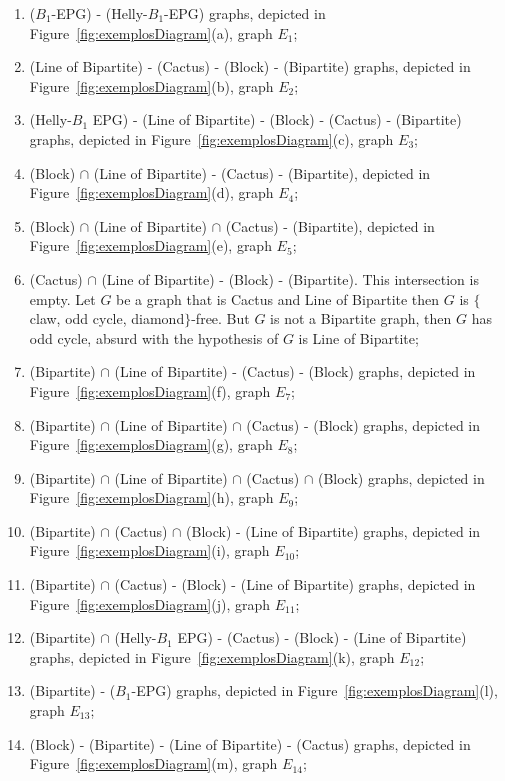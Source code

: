\documentclass[9pt]{entcs}
\begin{document}
\begin{enumerate}[label=(\arabic*)]
    \item ($B_1$-EPG)  - (Helly-$B_1$-EPG) graphs, depicted in Figure~\ref{fig:exemplosDiagram}(a), graph $E_1$;%
    
    \item (Line of Bipartite)  - (Cactus) - (Block) - (Bipartite) graphs, depicted in Figure~\ref{fig:exemplosDiagram}(b), graph $E_2$;%
    \item (Helly-$B_1$ EPG) - (Line of Bipartite) - (Block) - (Cactus) - (Bipartite) graphs, depicted in Figure~\ref{fig:exemplosDiagram}(c), graph $E_3$;%
    \item (Block) $\cap$ (Line of Bipartite) - (Cactus) - (Bipartite), depicted in Figure~\ref{fig:exemplosDiagram}(d), graph $E_4$;%
    \item (Block) $\cap$ (Line of Bipartite) $\cap$  (Cactus) - (Bipartite), depicted in Figure~\ref{fig:exemplosDiagram}(e), graph $E_5$;%
    \item (Cactus) $\cap$ (Line of Bipartite) - (Block) - (Bipartite). This intersection is empty. Let $G$ be a graph that is Cactus and Line of Bipartite then $G$ is $\{$claw, odd cycle, diamond$\}$-free. But $G$ is not a Bipartite graph, then $G$ has odd cycle, %
     absurd with the hypothesis of $G$ is Line of Bipartite;%
    \item (Bipartite) $\cap$ (Line of Bipartite)  - (Cactus) - (Block) graphs, depicted in Figure~\ref{fig:exemplosDiagram}(f), graph $E_7$;%
    \item (Bipartite) $\cap$ (Line of Bipartite) $\cap$  (Cactus) - (Block) graphs, depicted in Figure~\ref{fig:exemplosDiagram}(g), graph $E_8$;%
    \item (Bipartite) $\cap$ (Line of Bipartite) $\cap$  (Cactus) $\cap$ (Block) graphs, depicted in Figure~\ref{fig:exemplosDiagram}(h), graph $E_9$;%
  \item (Bipartite) $\cap$  (Cactus) $\cap$ (Block) - (Line of Bipartite) graphs, depicted in Figure~\ref{fig:exemplosDiagram}(i), graph $E_{10}$;%
    \item (Bipartite)  $\cap$  (Cactus) - (Block) -  (Line of Bipartite) graphs, depicted in Figure~\ref{fig:exemplosDiagram}(j), graph $E_{11}$;%
     \item (Bipartite) $\cap$ (Helly-$B_1$ EPG) - (Cactus) - (Block) -  (Line of Bipartite) graphs, depicted in Figure~\ref{fig:exemplosDiagram}(k), graph $E_{12}$;%
      \item (Bipartite) - ($B_1$-EPG) graphs, depicted in Figure~\ref{fig:exemplosDiagram}(l), graph $E_{13}$;%
      \item (Block) - (Bipartite) - (Line of Bipartite)  - (Cactus) graphs, depicted in Figure~\ref{fig:exemplosDiagram}(m), graph $E_{14}$;%
 

\end{enumerate}
\end{document}
